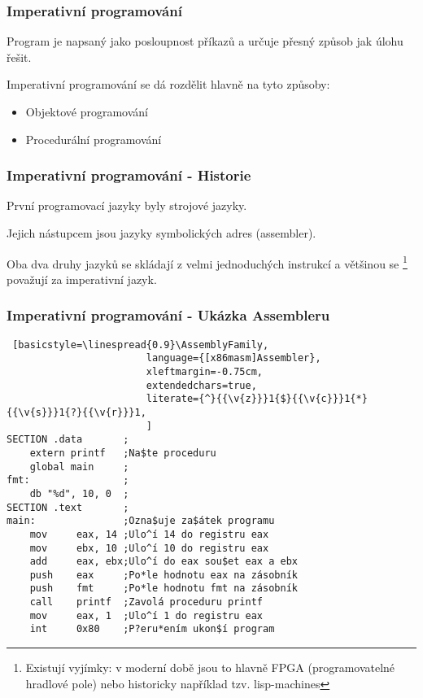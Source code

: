 \begin{frame}
    \frametitle{Imperativní programování}
    Program je napsaný jako posloupnost příkazů a určuje přesný způsob jak úlohu řešit. %

    Imperativní programování se dá rozdělit hlavně na tyto způsoby: 
    \begin{itemize}
        \item Objektové programování
        \item Procedurální programování
    \end{itemize}

    
\end{frame}

\begin{frame}[fragile]
    \frametitle{Imperativní programování - Historie}
    První programovací jazyky byly strojové jazyky. 

    Jejich nástupcem jsou jazyky symbolických adres (assembler). %
    
    Oba dva druhy jazyků se skládají z velmi jednoduchých instrukcí a většinou se
    \footnote{Existují vyjímky: v moderní době jsou to hlavně FPGA (programovatelné hradlové pole) nebo historicky například tzv. lisp-machines} považují za imperativní jazyk.
\end{frame}

\begin{frame}[fragile]
    \frametitle{Imperativní programování - Ukázka Assembleru}

    \newfontfamily{}
    \begin{lstlisting} [basicstyle=\linespread{0.9}\AssemblyFamily,
                        language={[x86masm]Assembler},
                        xleftmargin=-0.75cm,
                        extendedchars=true,
                        literate={^}{{\v{z}}}1{$}{{\v{c}}}1{*}{{\v{s}}}1{?}{{\v{r}}}1,
                        ]
SECTION .data       ;
    extern printf   ;Na$te proceduru
    global main     ;
fmt:                ;
    db "%d", 10, 0  ;
SECTION .text       ;
main:               ;Ozna$uje za$átek programu
    mov     eax, 14 ;Ulo^í 14 do registru eax
    mov     ebx, 10 ;Ulo^í 10 do registru eax
    add     eax, ebx;Ulo^í do eax sou$et eax a ebx 
    push    eax     ;Po*le hodnotu eax na zásobník
    push    fmt     ;Po*le hodnotu fmt na zásobník
    call    printf  ;Zavolá proceduru printf
    mov     eax, 1  ;Ulo^í 1 do registru eax
    int     0x80    ;P?eru*ením ukon$í program
    \end{lstlisting}
\end{frame}

